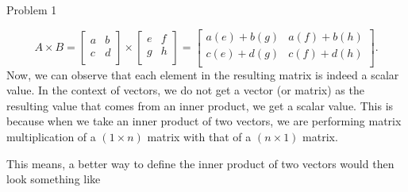 \begin{problem}{Problem 1}
\begin{highlight}
        \begin{equation}
            A \times B =
            \begin{bmatrix}
                a & b \\
                c & d \\
            \end{bmatrix}
            \times
            \begin{bmatrix}
                e & f \\
                g & h \\
            \end{bmatrix}
            = 
            \begin{bmatrix}
                a(e) + b(g) & a(f) + b(h) \\
                c(e) + d(g) & c(f) + d(h) \\
            \end{bmatrix}.
        \end{equation}
        Now, we can observe that each element in the resulting matrix is indeed a scalar value. In the context of vectors, we do not get a vector (or matrix) as the resulting value that comes from
        an inner product, we get a scalar value. This is because when we take an inner product of two vectors, we are performing matrix multiplication of a $(1 \times n)$ matrix with that of a 
        $(n \times 1)$ matrix.

        This means, a better way to define the inner product of two vectors would then look something like


\end{highlight}
\end{problem}
